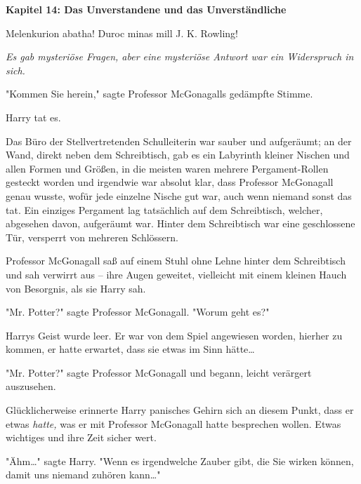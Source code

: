 

\hypertarget{das-unverstandene-und-das-unverstuxe4ndliche}{%

\textbf{Kapitel 14: Das Unverstandene und das Unverständliche}

Melenkurion abatha! Duroc minas mill J. K. Rowling!

\later

\emph{Es gab mysteriöse Fragen, aber eine mysteriöse Antwort war ein Widerspruch in sich.}

\later

"Kommen Sie herein," sagte Professor McGonagalls gedämpfte Stimme.

Harry tat es.

Das Büro der Stellvertretenden Schulleiterin war sauber und aufgeräumt; an der Wand, direkt neben dem Schreibtisch, gab es ein Labyrinth kleiner Nischen und allen Formen und Größen, in die meisten waren mehrere Pergament-Rollen gesteckt worden und irgendwie war absolut klar, dass Professor McGonagall genau wusste, wofür jede einzelne Nische gut war, auch wenn niemand sonst das tat. Ein einziges Pergament lag tatsächlich auf dem Schreibtisch, welcher, abgesehen davon, aufgeräumt war. Hinter dem Schreibtisch war eine geschlossene Tür, versperrt von mehreren Schlössern.

Professor McGonagall saß auf einem Stuhl ohne Lehne hinter dem Schreibtisch und sah verwirrt aus -- ihre Augen geweitet, vielleicht mit einem kleinen Hauch von Besorgnis, als sie Harry sah.

"Mr. Potter?" sagte Professor McGonagall. "Worum geht es?"

Harrys Geist wurde leer. Er war von dem Spiel angewiesen worden, hierher zu kommen, er hatte erwartet, dass sie etwas im Sinn hätte…

"Mr. Potter?" sagte Professor McGonagall und begann, leicht verärgert auszusehen.

Glücklicherweise erinnerte Harry panisches Gehirn sich an diesem Punkt, dass er etwas \emph{hatte,} was er mit Professor McGonagall hatte besprechen wollen. Etwas wichtiges und ihre Zeit sicher wert.

"Ähm…" sagte Harry. "Wenn es irgendwelche Zauber gibt, die Sie wirken können, damit uns niemand zuhören kann…"

}
